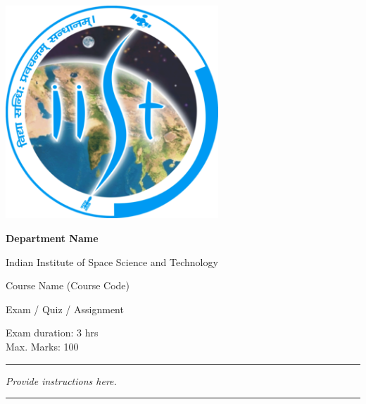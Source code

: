 \documentclass[11pt, a4paper, addpoints]{exam} %
\begin{document}

	\noindent
	\begin{minipage}[l]{.2\textwidth}%
		\noindent
		\includegraphics[width=0.6\textwidth]{IIST_logo}
	\end{minipage}
	\hfill
	\begin{minipage}[c]{.55\textwidth}%
		\vspace{0.1cm}
		\begin{center}
			{\bfseries Department Name \par
			   Indian Institute of Space Science and Technology \par
				\small Course Name {(\small Course Code)} \par
						Exam / Quiz / Assignment }
		\end{center}
		\vspace{0.15cm}
	\end{minipage}
	\begin{minipage}[r]{.2\textwidth}%
			\noindent
			\small
			\centering
			Exam duration: 3 hrs \\ Max. Marks: 100
	\end{minipage}
	\noindent \rule{\textwidth}{0.7pt}



	\textit{ \small Provide instructions here.}\\
	\rule{\textwidth}{0.7pt}

\end{document}

